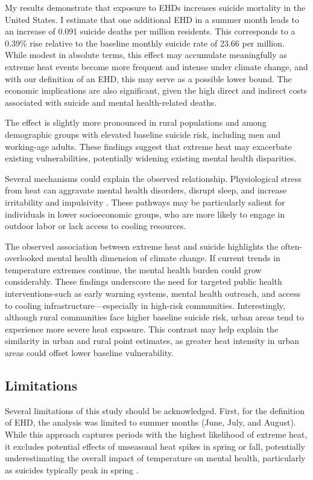 \documentclass[12pt, a4paper]{article}
\begin{document}
My results demonstrate that exposure to EHDs increases suicide mortality in the United States. I estimate that one additional EHD in a summer month leads to an increase of 0.091 suicide deaths per million residents. This corresponds to a 0.39\% rise relative to the baseline monthly suicide rate of 23.66 per million. While modest in absolute terms, this effect may accumulate meaningfully as extreme heat events become more frequent and intense under climate change, and with our definition of an EHD, this may serve as a possible lower bound. The economic implications are also significant, given the high direct and indirect costs associated with suicide and mental health-related deaths.

The effect is slightly more pronounced in rural populations and among demographic groups with elevated baseline suicide risk, including men and working-age adults. These findings suggest that extreme heat may exacerbate existing vulnerabilities, potentially widening existing mental health disparities.

Several mechanisms could explain the observed relationship. Physiological stress from heat can aggravate mental health disorders, disrupt sleep, and increase irritability and impulsivity \cite{Hsiang2013}. These pathways may be particularly salient for individuals in lower socioeconomic groups, who are more likely to engage in outdoor labor or lack access to cooling resources. 

The observed association between extreme heat and suicide highlights the often-overlooked mental health dimension of climate change. If current trends in temperature extremes continue, the mental health burden could grow considerably. These findings underscore the need for targeted public health interventions-such as early warning systems, mental health outreach, and access to cooling infrastructure—especially in high-risk communities. Interestingly, although rural communities face higher baseline suicide risk, urban areas tend to experience more severe heat exposure. This contrast may help explain the similarity in urban and rural point estimates, as greater heat intensity in urban areas could offset lower baseline vulnerability.

\subsection{Limitations}

Several limitations of this study should be acknowledged. First, for the definition of EHD, the analysis was limited to summer months (June, July, and August). While this approach captures periods with the highest likelihood of extreme heat, it excludes potential effects of unseasonal heat spikes in spring or fall, potentially underestimating the overall impact of temperature on mental health, particularly as suicides typically peak in spring \cite{bridges2005}.
\end{document}
